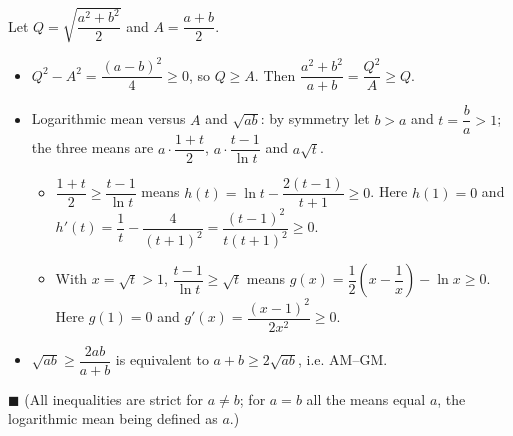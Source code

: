 Let $Q=\sqrt{\dfrac{a^2+b^2}{2}}$ and $A=\dfrac{a+b}{2}$.
\begin{itemize}
\item $Q^2-A^2=\dfrac{(a-b)^2}{4}\ge0$, so $Q\ge A$. Then $\dfrac{a^2+b^2}{a+b}=\dfrac{Q^2}{A}\ge Q$.
\item Logarithmic mean versus $A$ and $\sqrt{ab}$: by symmetry let $b>a$ and $t=\dfrac ba>1$; the three means are $a\cdot\dfrac{1+t}{2}$, $a\cdot\dfrac{t-1}{\ln t}$ and $a\sqrt t$.
\begin{itemize}
\item $\dfrac{1+t}{2}\ge\dfrac{t-1}{\ln t}$ means $h(t)=\ln t-\dfrac{2(t-1)}{t+1}\ge0$. Here $h(1)=0$ and $h'(t)=\dfrac1t-\dfrac{4}{(t+1)^2}=\dfrac{(t-1)^2}{t(t+1)^2}\ge0$.
\item With $x=\sqrt t>1$, $\dfrac{t-1}{\ln t}\ge\sqrt t$ means $g(x)=\dfrac12\left(x-\dfrac1x\right)-\ln x\ge0$. Here $g(1)=0$ and $g'(x)=\dfrac{(x-1)^2}{2x^2}\ge0$.
\end{itemize}
\item $\sqrt{ab}\ge\dfrac{2ab}{a+b}$ is equivalent to $a+b\ge2\sqrt{ab}$, i.e. AM--GM.
\end{itemize}
$\blacksquare$ (All inequalities are strict for $a\ne b$; for $a=b$ all the means equal $a$, the logarithmic mean being defined as $a$.)
